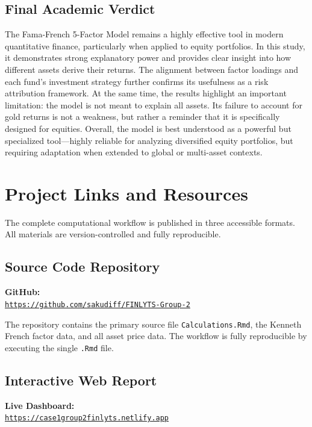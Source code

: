 \documentclass[12pt]{article}
\begin{document}
\subsection{Final Academic Verdict} 

The Fama-French 5-Factor Model remains a highly effective tool in modern quantitative finance, particularly when applied to equity portfolios. In this study, it demonstrates strong explanatory power and provides clear insight into how different assets derive their returns. The alignment between factor loadings and each fund’s investment strategy further confirms its usefulness as a risk attribution framework. At the same time, the results highlight an important limitation: the model is not meant to explain all assets. Its failure to account for gold returns is not a weakness, but rather a reminder that it is specifically designed for equities. Overall, the model is best understood as a powerful but specialized tool—highly reliable for analyzing diversified equity portfolios, but requiring adaptation when extended to global or multi-asset contexts.

\printbibliography

\newpage
\appendix

\section{Project Links and Resources} \label{sec:appendix_links}

The complete computational workflow is published in three accessible formats. All materials are version-controlled and fully reproducible.

\subsection*{Source Code Repository}
\begin{center}
    \large\textbf{GitHub:}\\[6pt]
    \href{https://github.com/sakudiff/FINLYTS-Group-2}{\texttt{https://github.com/sakudiff/FINLYTS-Group-2}}
\end{center}

\vspace{4pt}
The repository contains the primary source file \texttt{Calculations.Rmd}, the Kenneth French factor data, and all asset price data. The workflow is fully reproducible by executing the single \texttt{.Rmd} file.

\subsection*{Interactive Web Report}
\begin{center}
    \large\textbf{Live Dashboard:}\\[6pt]
    \href{https://case1group2finlyts.netlify.app}{\texttt{https://case1group2finlyts.netlify.app}}
\end{center}
\end{document}

